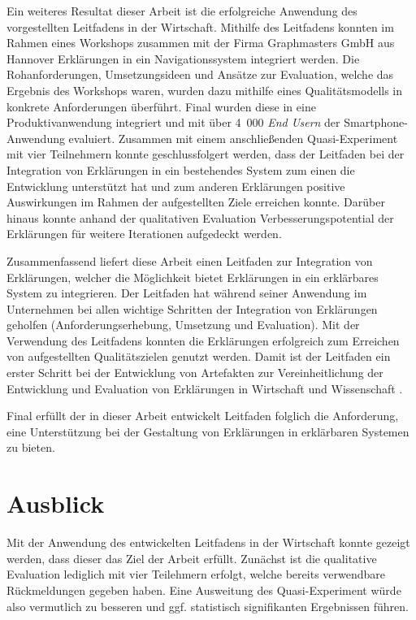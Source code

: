 Ein weiteres Resultat dieser Arbeit ist die erfolgreiche Anwendung des vorgestellten Leitfadens in der Wirtschaft. Mithilfe des Leitfadens konnten im Rahmen eines Workshops zusammen mit der Firma Graphmasters GmbH aus Hannover Erklärungen in ein Navigationssystem integriert werden. Die Rohanforderungen, Umsetzungsideen und Ansätze zur Evaluation, welche das Ergebnis des Workshops waren, wurden dazu mithilfe eines Qualitätsmodells in konkrete Anforderungen überführt. Final wurden diese in eine Produktivanwendung integriert und mit über 4~000 \textit{End Usern} der Smartphone-Anwendung evaluiert. Zusammen mit einem anschließenden Quasi-Experiment mit vier Teilnehmern konnte geschlussfolgert werden, dass der Leitfaden bei der Integration von Erklärungen in ein bestehendes System zum einen die Entwicklung unterstützt hat und zum anderen Erklärungen positive Auswirkungen im Rahmen der aufgestellten Ziele erreichen konnte. Darüber hinaus konnte anhand der qualitativen Evaluation Verbesserungspotential der Erklärungen für weitere Iterationen aufgedeckt werden.

\bigskip

Zusammenfassend liefert diese Arbeit einen Leitfaden zur Integration von Erklärungen, welcher die Möglichkeit bietet Erklärungen in ein erklärbares System zu integrieren. Der Leitfaden hat während seiner Anwendung im Unternehmen bei allen wichtige Schritten der Integration von Erklärungen geholfen (Anforderungserhebung, Umsetzung und Evaluation). Mit der Verwendung des Leitfadens konnten die Erklärungen erfolgreich zum Erreichen von aufgestellten Qualitätszielen genutzt werden. Damit ist der Leitfaden ein erster Schritt bei der Entwicklung von Artefakten zur Vereinheitlichung der Entwicklung und Evaluation von Erklärungen in Wirtschaft und Wissenschaft \cite{kohl_explainability_2019,lim_2009_assessing,sokol_explainability_2020}.

Final erfüllt der in dieser Arbeit entwickelt Leitfaden folglich die Anforderung, eine Unterstützung bei der Gestaltung von Erklärungen in erklärbaren Systemen zu bieten.

\section{Ausblick}

Mit der Anwendung des entwickelten Leitfadens in der Wirtschaft konnte gezeigt werden, dass dieser das Ziel der Arbeit erfüllt. Zunächst ist die qualitative Evaluation lediglich mit vier Teilehmern erfolgt, welche bereits verwendbare Rückmeldungen gegeben haben. Eine Ausweitung des Quasi-Experiment würde also vermutlich zu besseren und ggf. statistisch signifikanten Ergebnissen führen.

